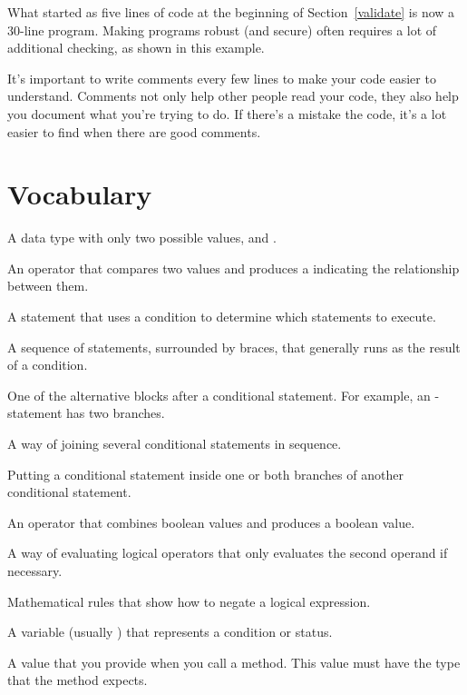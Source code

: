 What started as five lines of code at the beginning of Section~\ref{validate} is now a 30-line program.
Making programs robust (and secure) often requires a lot of additional checking, as shown in this example.

It's important to write comments every few lines to make your code easier to understand.
Comments not only help other people read your code, they also help you document what you're trying to do.
If there's a mistake the code, it's a lot easier to find when there are good comments.


\section{Vocabulary}

\begin{description}

A data type with only two possible values,  and .

An operator that compares two values and produces a  indicating the relationship between them.

A statement that uses a condition to determine which statements to execute.

A sequence of statements, surrounded by braces, that generally runs as the result of a condition.

One of the alternative blocks after a conditional statement.
For example, an - statement has two branches.

A way of joining several conditional statements in sequence.

Putting a conditional statement inside one or both branches of another conditional statement.

An operator that combines boolean values and produces a boolean value.

A way of evaluating logical operators that only evaluates the second operand if necessary.

Mathematical rules that show how to negate a logical expression.

A variable (usually ) that represents a condition or status.

A value that you provide when you call a method.
This value must have the type that the method expects.


\end{description}

